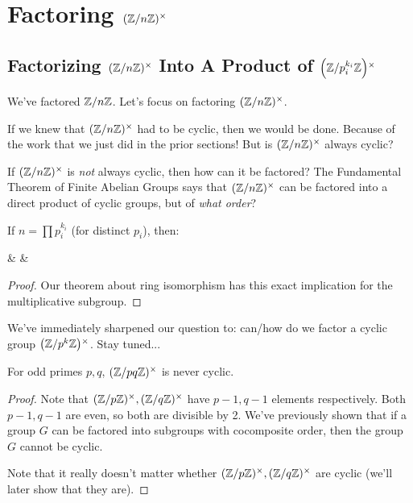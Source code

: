 \section{Factoring $\Zmodnx$}

\subsection{Factorizing $\Zmodnx$ Into A Product of $\Zmodx{p_i^{k_i}}$}

\begin{remark}
  We've factored $\Zmodn$. Let's focus on factoring $\Zmodnx$.

  If we knew that $\Zmodnx$ had to be cyclic, then we would be done.
  Because of the work that we just did in the prior sections! But is
  $\Zmodnx$ always cyclic?

  If $\Zmodnx$ is \emph{not} always cyclic, then how can it be factored?
  The Fundamental Theorem of Finite Abelian Groups says that $\Zmodnx$
  can be factored into a direct product of cyclic groups, but of
  \emph{what order}?
\end{remark}

\begin{theorem}
  If $n = \prod p_i^{k_i}$ (for distinct $p_i$), then:

  \begin{nedqn}
  & \cong &
     \times \cdots \times {}
  \end{nedqn}
\end{theorem}

\begin{proof}
  Our theorem about ring isomorphism has this exact implication for the
  multiplicative subgroup.
\end{proof}

\begin{remark}
  We've immediately sharpened our question to: can/how do we factor a
  cyclic group $\Zmodx{p^k}$. Stay tuned...
\end{remark}

\begin{proposition}
  For odd primes $p, q$, $\Zmodx{pq}$ is never cyclic.
\end{proposition}

\begin{proof}
  Note that $\Zmodx{p}, \Zmodx{q}$ have $p-1, q-1$ elements
  respectively. Both $p-1, q-1$ are even, so both are divisible by 2.
  We've previously shown that if a group $G$ can be factored into
  subgroups with cocomposite order, then the group $G$ cannot be cyclic.

  Note that it really doesn't matter whether $\Zmodx{p}, \Zmodx{q}$ are
  cyclic (we'll later show that they are).
\end{proof}


